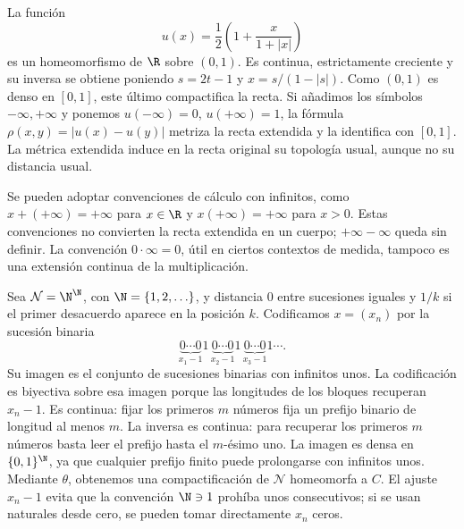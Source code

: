 \begin{ejemplo}
La función
\[
u(x)=\frac12\left(1+\frac{x}{1+|x|}\right)
\]
es un homeomorfismo de $\R$ sobre $(0,1)$. Es continua, estrictamente creciente y su inversa se obtiene poniendo $s=2t-1$ y $x=s/(1-|s|)$. Como $(0,1)$ es denso en $[0,1]$, este último compactifica la recta. Si añadimos los símbolos $-\infty,+\infty$ y ponemos $u(-\infty)=0$, $u(+\infty)=1$, la fórmula $\rho(x,y)=|u(x)-u(y)|$ metriza la recta extendida y la identifica con $[0,1]$. La métrica extendida induce en la recta original su topología usual, aunque no su distancia usual.

Se pueden adoptar convenciones de cálculo con infinitos, como $x+(+\infty)=+\infty$ para $x\in\R$ y $x(+\infty)=+\infty$ para $x>0$. Estas convenciones no convierten la recta extendida en un cuerpo; $+\infty-\infty$ queda sin definir. La convención $0\cdot\infty=0$, útil en ciertos contextos de medida, tampoco es una extensión continua de la multiplicación.
\end{ejemplo}

\begin{ejemplo}
Sea $\mathcal N=\N^{\N}$, con $\N=\{1,2,\ldots\}$, y distancia $0$ entre sucesiones iguales y $1/k$ si el primer desacuerdo aparece en la posición $k$. Codificamos $x=(x_n)$ por la sucesión binaria
\[
\underbrace{0\cdots0}_{x_1-1}1\,
\underbrace{0\cdots0}_{x_2-1}1\,
\underbrace{0\cdots0}_{x_3-1}1\cdots.
\]
Su imagen es el conjunto de sucesiones binarias con infinitos unos. La codificación es biyectiva sobre esa imagen porque las longitudes de los bloques recuperan $x_n-1$. Es continua: fijar los primeros $m$ números fija un prefijo binario de longitud al menos $m$. La inversa es continua: para recuperar los primeros $m$ números basta leer el prefijo hasta el $m$-ésimo uno. La imagen es densa en $\{0,1\}^{\N}$, ya que cualquier prefijo finito puede prolongarse con infinitos unos. Mediante $\theta$, obtenemos una compactificación de $\mathcal N$ homeomorfa a $C$. El ajuste $x_n-1$ evita que la convención $\N\ni1$ prohíba unos consecutivos; si se usan naturales desde cero, se pueden tomar directamente $x_n$ ceros.
\end{ejemplo}

